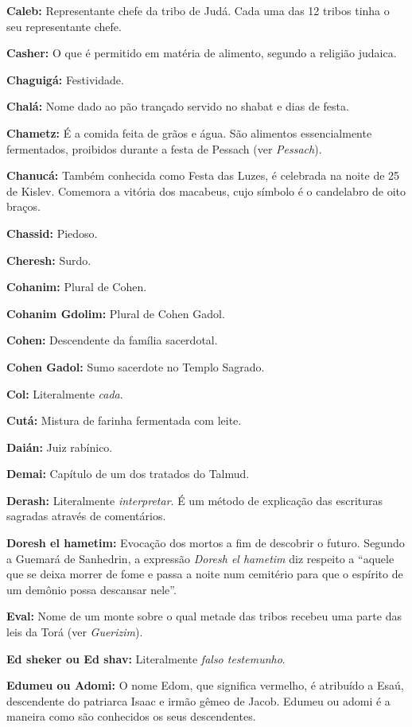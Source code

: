\begin{hangparas}{.25in}{1}
{\textbf{Caleb:} Representante chefe da tribo de Judá. Cada uma das 12
tribos tinha o seu representante chefe.

\textbf{Casher:} O que é permitido em matéria de alimento, segundo a
religião judaica.

\textbf{Chaguigá:} Festividade.

\textbf{Chalá:} Nome dado ao pão trançado servido no shabat e dias de festa.

\textbf{Chametz:} É a comida feita de grãos e água. São alimentos 
essencialmente fermentados, proibidos durante a festa 
de Pessach (ver \emph{Pessach}).

\textbf{Chanucá:} Também conhecida como Festa das Luzes, é celebrada 
na noite de 25 de Kislev. Comemora a vitória dos macabeus, 
cujo símbolo é o candelabro de oito braços.

\textbf{Chassid:} Piedoso.

\textbf{Cheresh:} Surdo.

\textbf{Cohanim:} Plural de Cohen.

\textbf{Cohanim Gdolim:} Plural de Cohen Gadol.

\textbf{Cohen:} Descendente da família sacerdotal.

\textbf{Cohen Gadol:} Sumo sacerdote no Templo Sagrado.

\textbf{Col:} Literalmente \emph{cada}.

\textbf{Cutá:} Mistura de farinha fermentada com leite.

\textbf{Daián:} Juiz rabínico.

\textbf{Demai:} Capítulo de um dos tratados do Talmud.

\textbf{Derash:} Literalmente \emph{interpretar}. É um método de explicação 
das escrituras sagradas através de comentários.

\textbf{Doresh el hametim:} Evocação dos mortos a fim de descobrir o futuro. 
Segundo a Guemará de Sanhedrin, a expressão \emph{Doresh el hametim} diz respeito 
a ``aquele que se deixa morrer de fome e passa a noite num cemitério para
que o espírito de um demônio possa descansar nele''.

\textbf{Eval:} Nome de um monte sobre o qual metade das tribos recebeu uma parte 
das leis da Torá (ver \emph{Guerizim}).

\textbf{Ed sheker ou Ed shav:} Literalmente \emph{falso testemunho}.

\textbf{Edumeu ou Adomi:} O nome Edom, que significa vermelho, é atribuído a 
Esaú, descendente do patriarca Isaac e irmão gêmeo de Jacob. Edumeu ou adomi 
é a maneira como são conhecidos os seus descendentes.

}
\end{hangparas}

